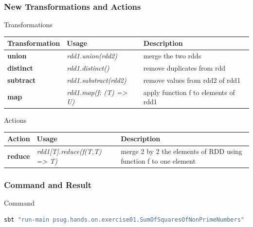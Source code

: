 \documentclass[slidetop,9pt,utf8]{beamer}
\begin{document}
\begin{CJK}{UTF8}{gbsn}
\begin{frame}

  \frametitle{New Transformations and Actions}

  \begin{block}{Transformations}
    \begin{center}
      \begin{tabular}{|m{2.1cm}|m{3.5cm}|m{5cm}|}
        \hline 
        \rowcolor{gray} \textbf{Transformation} & \textbf{Usage} & \textbf{Description} \\ \hline
        \textbf{union} & \textit{rdd1.union(rdd2)} & merge the two rdds \\ \hline
        \textbf{distinct} & \textit{rdd1.distinct()} & remove duplicates from rdd \\ \hline
        \textbf{subtract} & \textit{rdd1.substract(rdd2)} & remove values from rdd2 of rdd1 \\ \hline
        \textbf{map} & \textit{rdd1.map(f: (T) =\textgreater\xspace U)} & apply function f to elements of rdd1 \\ \hline
      \end{tabular}
    \end{center}
  \end{block}

  \begin{block}{Actions}
    \begin{center}
      \begin{tabular}{|m{2.1cm}|m{3.5cm}|m{5cm}|}
        \hline 
        \rowcolor{gray} \textbf{Action} & \textbf{Usage} & \textbf{Description} \\ \hline
        \textbf{reduce} & \textit{rdd1[T].reduce(f(T,T) =\textgreater\xspace T)} & merge 2 by 2 the elements of RDD using function f to one element \\ \hline
      \end{tabular}
    \end{center}
  \end{block}

\end{frame}

\begin{frame}[fragile]
  \frametitle{Command and Result}

  \begin{block}{Command}
    \begin{lstlisting}[language=bash, style=terminal-medium]
sbt "run-main psug.hands.on.exercise01.SumOfSquaresOfNonPrimeNumbers"
    \end{lstlisting}
  \end{block}


\end{frame}
\end{CJK}
\end{document}
